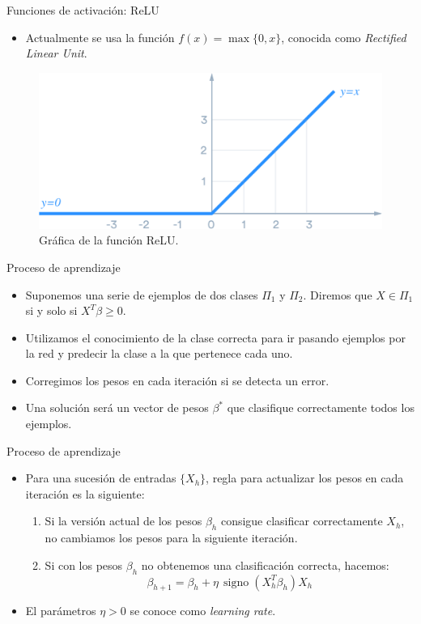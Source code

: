 \documentclass[spanish]{beamer}
\begin{document}
\begin{frame}{Funciones de activación: ReLU}
  \begin{itemize}
    \item Actualmente se usa la función $f(x) = \max \{0, x\}$, conocida como \textit{Rectified Linear Unit}.
  \end{itemize}

    \begin{figure}[h]
    \centering
    \includegraphics[width=.75\textwidth]{img/relu}
    \caption{Gráfica de la función ReLU.}
  \end{figure}

\end{frame}

\begin{frame}{Proceso de aprendizaje}
\begin{itemize}
\item Suponemos una serie de ejemplos de dos clases $\Pi_1$ y $\Pi_2$. Diremos que $X \in \Pi_1$ si y solo si $X^T\beta \ge 0$.
\item Utilizamos el conocimiento de la clase correcta para ir pasando ejemplos por la red y predecir la clase a la que pertenece cada uno.
\item Corregimos los pesos en cada iteración si se detecta un error.
\item Una solución será un vector de pesos $\beta^\ast$ que clasifique correctamente todos los ejemplos.
\end{itemize}
\end{frame}

\begin{frame}{Proceso de aprendizaje}
\begin{itemize}
\item Para una sucesión de entradas $\{X_h\}$, regla para actualizar los pesos en cada iteración es la siguiente:
  \begin{enumerate}
    \item Si la versión actual de los pesos $\beta_h$ consigue clasificar correctamente $X_h$, no cambiamos los pesos para la siguiente iteración.
    \item Si con los pesos $\beta_h$ no obtenemos una clasificación correcta, hacemos:
    $$\beta_{h+1} = \beta_h + \eta \, \operatorname{signo}(X^{T}_{h} \beta_h)X_h $$
  \end{enumerate}
  \item El parámetros $\eta > 0$ se conoce como \textit{learning rate}.
\end{itemize}
\end{frame}
\end{document}
